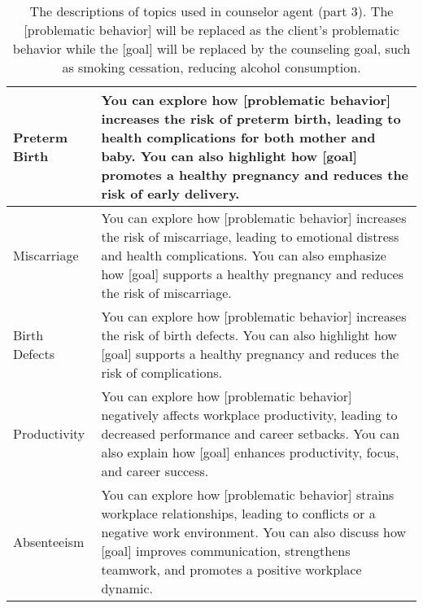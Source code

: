 \begin{table*}[tb]
\begin{tabularx}{\textwidth}{lX}
Preterm Birth               & You can explore how [problematic behavior] increases the risk of preterm birth, leading to health complications for both mother and baby. You can also highlight how [goal] promotes a healthy pregnancy and reduces the risk of early delivery.                                                                                                                                                                                   \\ \hline
Miscarriage                 & You can explore how [problematic behavior] increases the risk of miscarriage, leading to emotional distress and health complications. You can also emphasize how [goal] supports a healthy pregnancy and reduces the risk of miscarriage.                                                                                                                                                                                          \\ \hline
Birth Defects               & You can explore how [problematic behavior] increases the risk of birth defects. You can also highlight how [goal] supports a healthy pregnancy and reduces the risk of complications.                                                                                                                                                                                                                                              \\ \hline
Productivity                & You can explore how [problematic behavior] negatively affects workplace productivity, leading to decreased performance and career setbacks. You can also explain how [goal] enhances productivity, focus, and career success.                                                                                                                                                                                                      \\ \hline
Absenteeism                 & You can explore how [problematic behavior] strains workplace relationships, leading to conflicts or a negative work environment. You can also discuss how [goal] improves communication, strengthens teamwork, and promotes a positive workplace dynamic. 
\\ \bottomrule
\end{tabularx}
\caption{The descriptions of topics used in counselor agent (part 3). The [problematic behavior] will be replaced as the client's problematic behavior while the [goal] will be replaced by the counseling goal, such as smoking cessation, reducing alcohol consumption.}
\label{tab:counselor topic description 3}
\end{table*}                                                                                                                                                    


